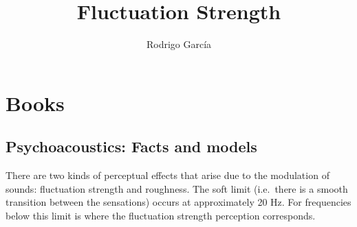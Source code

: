 \documentclass{article}
\begin{document}
\title{Fluctuation Strength}
\author{Rodrigo García}
\maketitle

\section{Books}

\subsection{Psychoacoustics: Facts and models}

There are two kinds of perceptual effects that arise due to the modulation of
sounds: fluctuation strength and roughness. The soft limit (i.e.\ there is a
smooth transition between the sensations) occurs at approximately 20 Hz. For
frequencies below this limit is where the fluctuation strength perception
corresponds.
\end{document}
